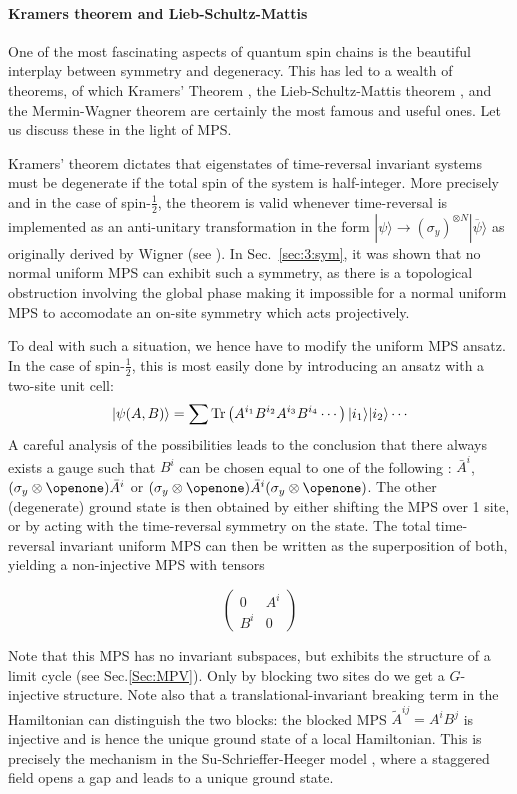 \documentclass[rmp,aps,reprint,superscriptaddress,nobalancelastpage]{revtex4-1}
\def\Id{{\openone}}
\newcommand{\be}{\begin{equation}}
\newcommand{\ee}{\end{equation}}
\newcommand{\mat}[2]{\left(\begin{array}{#1}#2\end{array}\right)}
\begin{document}
\paragraph{Kramers theorem and Lieb-Schultz-Mattis}
One of the most fascinating aspects of quantum spin chains is the beautiful interplay between symmetry and degeneracy. This has led to a wealth of theorems, of which Kramers' Theorem \cite{kramers1930theorie}, the Lieb-Schultz-Mattis theorem \cite*{lieb1961two}, and  the Mermin-Wagner theorem \cite{mermin1966absence} are certainly the most famous and useful ones. Let us discuss these in the light of MPS.

Kramers' theorem dictates that eigenstates of time-reversal invariant systems must be degenerate if the total spin of the system is half-integer. More precisely and in the case of spin-$\tfrac12$, the theorem is valid whenever time-reversal is implemented as an anti-unitary transformation in the form $|\psi\rangle\rightarrow (\sigma_y)^{\otimes N}|\overline{\psi}\rangle$ as originally derived by Wigner (see  ). In Sec.~\ref{sec:3:sym}, it was shown that no normal uniform MPS can exhibit such a symmetry, as there is a topological obstruction involving the global phase making it impossible for a normal uniform MPS to accomodate an on-site symmetry which acts projectively.

To deal with such a situation, we hence have to modify the uniform MPS ansatz. In the case of spin-$\tfrac12$, this is most easily done by introducing an ansatz with a two-site unit cell:
\be |\psi(A,B)\rangle=\sum {\rm Tr}\left(A^{i_1}B^{i_2}A^{i_3}B^{i_4}\cdots\right)|i_1\rangle|i_2\rangle\cdots\label{mpsAB}\ee
A careful analysis of the possibilities leads to the conclusion that there always exists a gauge such that $B^i$ can be chosen equal to one of the following : $\bar{A}^i$, $(\sigma_y\otimes\Id)\bar{A}^i$  or
$(\sigma_y\otimes\Id)\bar{A}^i(\sigma_y\otimes\Id)$. The other (degenerate) ground state is then obtained by either shifting the MPS over 1 site, or by acting with the time-reversal symmetry on the state.  The total time-reversal invariant uniform MPS can then be written as the superposition of both, yielding a non-injective MPS with tensors

\be \mat{cc}{0& A^i\\B^i & 0} \label{nonijAB}\ee

Note that this MPS has no invariant subspaces, but exhibits the structure of a limit cycle (see Sec.\ref{Sec:MPV}). Only by blocking two sites do we get a $G$-injective structure. Note also that a translational-invariant breaking term in the Hamiltonian can distinguish the two blocks: the blocked MPS $\tilde{A}^{ij}=A^iB^j$ is injective and is hence the unique ground state of a local Hamiltonian. This is precisely the mechanism in the Su-Schrieffer-Heeger model \cite{su1979solitons}, where a staggered field opens a gap and leads to a unique ground state.
\end{document}
